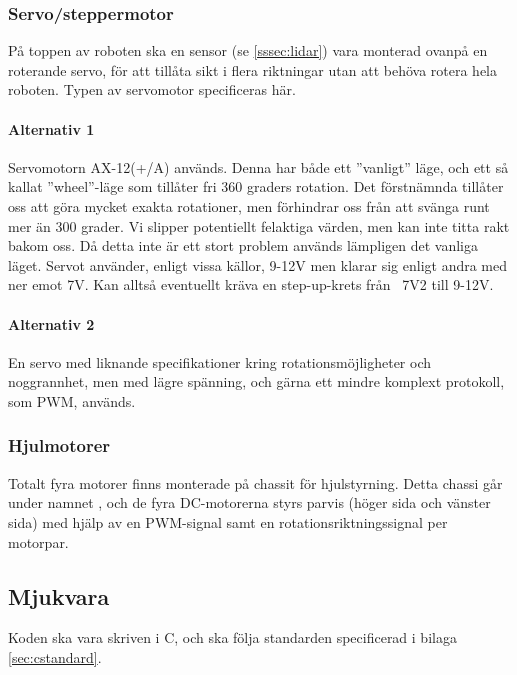 \documentclass[a4paper,11pt]{article}
\begin{document}
\subsubsection{Servo/steppermotor} \label{ssec:servomotor}
På toppen av roboten ska en sensor (se \ref{sssec:lidar}) vara monterad ovanpå en roterande servo, för att tillåta sikt i flera riktningar utan att behöva rotera hela roboten. Typen av servomotor specificeras här.

\paragraph{Alternativ 1}
Servomotorn AX-12(+/A) används. Denna har både ett ''vanligt'' läge, och ett så kallat ''wheel''-läge som tillåter fri 360 graders rotation. Det förstnämnda tillåter oss att göra mycket exakta rotationer, men förhindrar oss från att svänga runt mer än 300 grader. Vi slipper potentiellt felaktiga värden, men kan inte titta rakt bakom oss. Då detta inte är ett stort problem används lämpligen det vanliga läget. Servot använder, enligt vissa källor, 9-12V men klarar sig enligt andra med ner emot 7V. Kan alltså eventuellt kräva en step-up-krets från ~7V2 till 9-12V.

\paragraph{Alternativ 2}
En servo med liknande specifikationer kring rotationsmöjligheter och noggrannhet, men med lägre spänning, och gärna ett mindre komplext protokoll, som PWM, används.


\subsubsection{Hjulmotorer}
Totalt fyra motorer finns monterade på chassit för hjulstyrning. Detta chassi går under namnet \cite{terminator}, och de fyra DC-motorerna styrs parvis (höger sida och vänster sida) med hjälp av en PWM-signal samt en rotationsriktningssignal per motorpar.

\subsection{Mjukvara}

Koden ska vara skriven i C, och ska följa standarden specificerad i bilaga \ref{sec:cstandard}.
\end{document}
